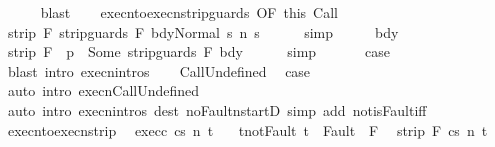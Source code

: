 \begin{isabellebody}
\ \ \ \ \isamarkupfalse%
\ blast\isanewline
\ \ \isamarkupfalse%
\ execn{\isacharunderscore}to{\isacharunderscore}execn{\isacharunderscore}strip{\isacharunderscore}guards\ {\isacharbrackleft}OF\ this{\isacharbrackright}\ Call\isanewline
\ \ \isamarkupfalse%
\ {\isachardoublequoteopen}strip\ F\ {\isasymGamma}{\isasymturnstile}{\isasymlangle}strip{\isacharunderscore}guards\ F\ bdy{\isacharcomma}Normal\ s{\isasymrangle}\ {\isacharequal}n{\isasymRightarrow}\ s{\isacharprime}{\isachardoublequoteclose}\isanewline
\ \ \ \ \isamarkupfalse%
\ simp\isanewline
\ \ \isamarkupfalse%
\ \isamarkupfalse%
\ bdy\ \isamarkupfalse%
\ {\isachardoublequoteopen}{\isacharparenleft}strip\ F\ {\isasymGamma}{\isacharparenright}\ p\ {\isacharequal}\ Some\ {\isacharparenleft}strip{\isacharunderscore}guards\ F\ bdy{\isacharparenright}{\isachardoublequoteclose}\isanewline
\ \ \ \ \isamarkupfalse%
\ simp\isanewline
\ \ \isamarkupfalse%
\isanewline
\ \ \isamarkupfalse%
\ {\isacharquery}case\isanewline
\ \ \ \ \isamarkupfalse%
\ {\isacharparenleft}blast\ intro{\isacharcolon}\ execn{\isachardot}intros{\isacharparenright}\isanewline
{}\isamarkupfalse%
\isanewline
\ \ \isamarkupfalse%
\ CallUndefined\ \isamarkupfalse%
\ {\isacharquery}case\ \isamarkupfalse%
\ {\isacharparenleft}auto\ intro{\isacharcolon}\ execn{\isachardot}CallUndefined{\isacharparenright}\isanewline
{}\isamarkupfalse%
\ {\isacharparenleft}auto\ intro{\isacharcolon}\ execn{\isachardot}intros\ dest{\isacharcolon}\ noFaultn{\isacharunderscore}startD{\isacharprime}\ simp\ add{\isacharcolon}\ not{\isacharunderscore}isFault{\isacharunderscore}iff{\isacharparenright}%
\endisatagproof
{\isafoldproof}%
%
\isadelimproof
\isanewline
%
\endisadelimproof
\isanewline
{}\isamarkupfalse%
\ execn{\isacharunderscore}to{\isacharunderscore}execn{\isacharunderscore}strip{\isacharprime}{\isacharcolon}\isanewline
\ \ exec{\isacharunderscore}c{\isacharcolon}\ {\isachardoublequoteopen}{\isasymGamma}{\isasymturnstile}{\isasymlangle}c{\isacharcomma}s{\isasymrangle}\ {\isacharequal}n{\isasymRightarrow}\ t{\isachardoublequoteclose}\ \isanewline
\ \ t{\isacharunderscore}not{\isacharunderscore}Fault{\isacharcolon}\ {\isachardoublequoteopen}t\ {\isasymnotin}\ Fault\ {\isacharbackquote}\ F{\isachardoublequoteclose}\isanewline
\ \ {\isachardoublequoteopen}strip\ F\ {\isasymGamma}{\isasymturnstile}{\isasymlangle}c{\isacharcomma}s{\isasymrangle}\ {\isacharequal}n{\isasymRightarrow}\ t{\isachardoublequoteclose}\isanewline

\end{isabellebody}
